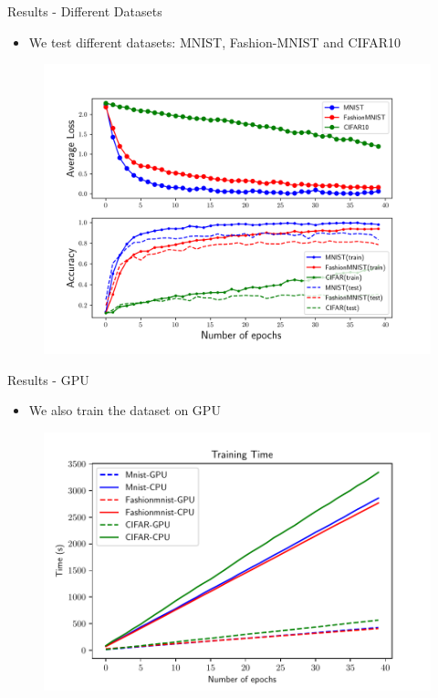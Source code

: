 \documentclass[llpt]{beamer}
\begin{document}
\begin{frame}{Results - Different Datasets}
    \begin{itemize}
        \item We test different datasets: MNIST, Fashion-MNIST and CIFAR10
    \end{itemize}
    \begin{figure}
      \includegraphics[width=.9\textwidth]{test.png}
    \end{figure}
\end{frame}

\begin{frame}{Results - GPU}
    \begin{itemize}
        \item We also train the dataset on GPU
    \end{itemize}
    \begin{figure}
      \includegraphics[width=.9\textwidth]{Running_time.pdf}
    \end{figure}
\end{frame}
\end{document}
